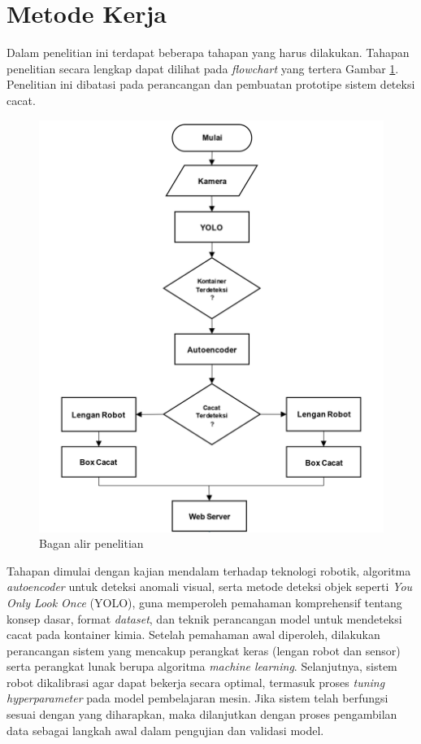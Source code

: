 \vspace{1em}

\section{Metode Kerja}
Dalam penelitian ini terdapat beberapa tahapan yang harus dilakukan.
Tahapan penelitian secara lengkap dapat dilihat pada
\textit{flowchart} yang tertera
Gambar \ref{fig:bagan-alir}. Penelitian ini dibatasi pada perancangan
dan pembuatan prototipe sistem deteksi cacat.
\begin{figure}[H]
  \centering
  \includegraphics[]{gambar/flowchart.jpg}
  \caption{Bagan alir penelitian}
  \label{fig:bagan-alir}
\end{figure}
\vspace{-1em}

Tahapan dimulai dengan kajian mendalam terhadap teknologi robotik,
algoritma \textit{autoencoder} untuk deteksi anomali visual, serta
metode deteksi objek seperti \textit{You Only Look Once} (YOLO), guna
memperoleh pemahaman komprehensif tentang konsep dasar, format
\textit{dataset}, dan teknik perancangan model untuk mendeteksi cacat
pada kontainer kimia. Setelah pemahaman awal diperoleh, dilakukan
perancangan sistem yang mencakup perangkat keras (lengan robot dan
sensor) serta perangkat lunak berupa algoritma \textit{machine
learning}. Selanjutnya, sistem robot dikalibrasi agar dapat bekerja
secara optimal, termasuk proses \textit{tuning hyperparameter} pada
model pembelajaran mesin. Jika sistem telah berfungsi sesuai dengan
yang diharapkan, maka dilanjutkan dengan proses pengambilan data
sebagai langkah awal dalam pengujian dan validasi model.

